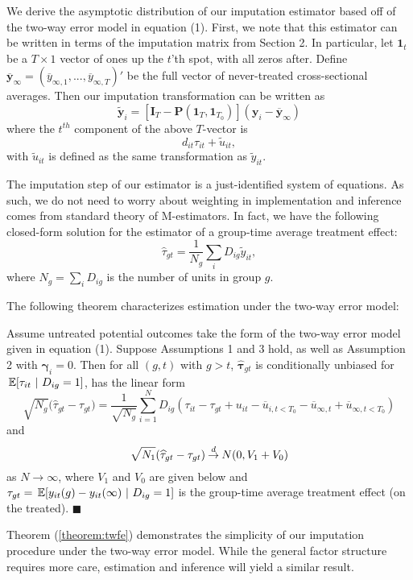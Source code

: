 We derive the asymptotic distribution of our imputation estimator based off of the two-way error model in equation (1). First, we note that this estimator can be written in terms of the imputation matrix from Section 2. In particular, let $\bm 1_t$ be a $T \times 1$ vector of ones up the $t$'th spot, with all zeros after. Define $\overline{\bm y}_{\infty} = (\overline{y}_{\infty, 1},..., \overline{y}_{\infty, T})'$ be the full vector of never-treated cross-sectional averages. Then our imputation transformation can be written as 
\begin{equation}
    \tilde{\bm y}_i = \left[ \bm I_T - \bm P(\bm 1_T, \bm 1_{T_0}) \right] (\bm y_i - \overline{\bm y}_{\infty})
\end{equation}
where the $t^{th}$ component of the above $T$-vector is 
\begin{equation}
    d_{it} \tau_{it} + \tilde{u}_{it},
\end{equation}
with $\tilde{u}_{it}$ is defined as the same transformation as $\tilde{y}_{it}$.

The imputation step of our estimator is a just-identified system of equations. As such, we do not need to worry about weighting in implementation and inference comes from standard theory of M-estimators. In fact, we have the following closed-form solution for the estimator of a group-time average treatment effect: 
\begin{equation}
    \widehat{\tau}_{gt} = \frac{1}{N_{g}}\sum_{i} D_{ig} \tilde{y}_{it},
\end{equation}
where $N_{g} = \sum_i D_{ig}$ is the number of units in group $g$. 

The following theorem characterizes estimation under the two-way error model:
\begin{theorem}\label{theorem:twfe}
    Assume untreated potential outcomes take the form of the two-way error model given in equation (1). Suppose Assumptions 1 and 3 hold, as well as Assumption 2 with $\bm \gamma_i = 0$. Then for all $(g, t)$ with $g > t$, $\widehat{\bm \tau}_{gt}$ is conditionally unbiased for $\expec{\tau_{it}}{D_{ig} = 1}$, has the linear form
    \begin{equation}\label{eq:twfe_influence}
        \sqrt{N_{g}} \big( \widehat{\tau}_{gt} - \tau_{gt} \big) 
        = \frac{1}{\sqrt{N_{g}}}\sum_{i=1}^N D_{ig} (\tau_{it} - \tau_{gt} + u_{it} - \overline{u}_{i,t < T_0} - \overline{u}_{\infty,t} + \overline{u}_{\infty,t < T_0})
    \end{equation}
    and  
    \begin{equation}\label{eq:twfe_asymptotic}
        \sqrt{N_1}(\widehat{\tau}_{gt} - \tau_{gt}) \mathbin{\overset{d}{\to}} N(0, V_1 + V_0)
    \end{equation}
    as $N \rightarrow \infty$, where $V_1$ and $V_0$ are given below and $\tau_{gt} = \expec{y_{it}(g) - y_{it}(\infty)}{D_{ig} = 1}$ is the group-time average treatment effect (on the treated). $\blacksquare$
\end{theorem}
Theorem (\ref{theorem:twfe}) demonstrates the simplicity of our imputation procedure under the two-way error model. While the general factor structure requires more care, estimation and inference will yield a similar result.


